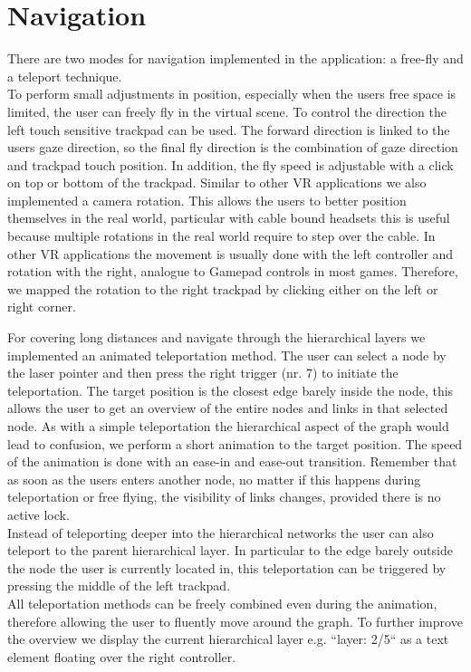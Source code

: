 \section{Navigation}
\label{chap:solution-navigation}

There are two modes for navigation implemented in the application: a free-fly and a teleport technique.\\
To perform small adjustments in position, especially when the users free space is limited, the user can freely fly in the virtual scene. To control the direction the left touch sensitive trackpad can be used. 
The forward direction is linked to the users gaze direction, so the final fly direction is the combination of gaze direction and trackpad touch position. 
In addition, the fly speed is adjustable with a click on top or bottom of the trackpad.    
Similar to other VR applications we also implemented a camera rotation. This allows the users to better position themselves in the real world, particular with cable bound headsets this is useful because multiple rotations in the real world require to step over the cable. In other VR applications the movement is usually done with the left controller and rotation with the right, analogue to Gamepad controls in most games. Therefore, we mapped the rotation to the right trackpad by clicking either on the left or right corner.

For covering long distances and navigate through the hierarchical layers we implemented an animated teleportation method. The user can select a node by the laser pointer and then press the right trigger (nr. 7) to initiate the teleportation. The target position is the closest edge barely inside the node, this allows the user to get an overview of the entire nodes and links in that selected node.   
As with a simple teleportation the hierarchical aspect of the graph would lead to confusion, we perform a short animation to the target position. The speed of the animation is done with an ease-in and ease-out transition.
Remember that as soon as the users enters another node, no matter if this happens during teleportation or free flying, the visibility of links changes, provided there is no active lock.\\
Instead of teleporting deeper into the hierarchical networks the user can also teleport to the parent hierarchical layer. In particular to the edge barely outside the node the user is currently located in, this teleportation can be triggered by pressing the middle of the left trackpad.\\
All teleportation methods can be freely combined even during the animation, therefore allowing the user to fluently move around the graph. 
To further improve the overview we display the current hierarchical layer e.g. “layer: 2/5“ as a text element floating over the right controller. 

